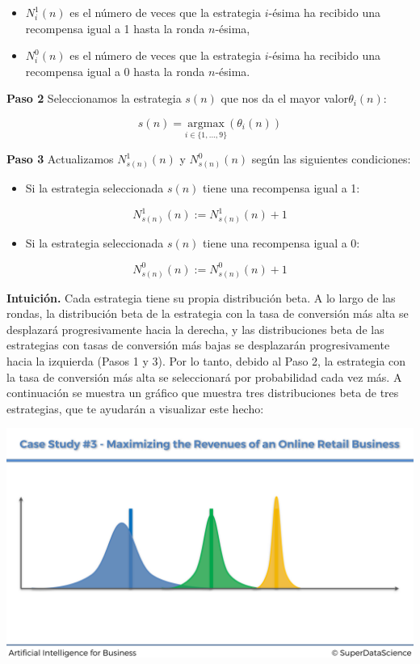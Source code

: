 \documentclass[
]{book}
\providecommand{\tightlist}{%
  \setlength{\itemsep}{0pt}\setlength{\parskip}{0pt}}
\begin{document}
\begin{itemize}
\tightlist
\item
  \(N_i^1(n)\) es el número de veces que la estrategia \(i\)-ésima ha recibido una recompensa igual a 1 hasta la ronda \(n\)-ésima,
\item
  \(N_i^0(n)\) es el número de veces que la estrategia \(i\)-ésima ha recibido una recompensa igual a 0 hasta la ronda \(n\)-ésima.
\end{itemize}

\textbf{Paso 2} Seleccionamos la estrategia \(s(n)\) que nos da el mayor valor\(\theta_i(n)\):

\[s(n) = \underset{i\in\{1,...,9\}}{\textrm{argmax}}(\theta_i(n))\]

\textbf{Paso 3} Actualizamos \(N_{s(n)}^1(n)\) y \(N_{s(n)}^0(n)\) según las siguientes condiciones:

\begin{itemize}
\tightlist
\item
  Si la estrategia seleccionada \(s(n)\) tiene una recompensa igual a 1:
\end{itemize}

\[N_{s(n)}^1(n) := N_{s(n)}^1(n) + 1\]

\begin{itemize}
\tightlist
\item
  Si la estrategia seleccionada \(s(n)\) tiene una recompensa igual a 0:
\end{itemize}

\[N_{s(n)}^0(n) := N_{s(n)}^0(n) + 1\]

\textbf{Intuición.} Cada estrategia tiene su propia distribución beta. A lo largo de las rondas, la distribución beta de la estrategia con la tasa de conversión más alta se desplazará progresivamente hacia la derecha, y las distribuciones beta de las estrategias con tasas de conversión más bajas se desplazarán progresivamente hacia la izquierda (Pasos 1 y 3). Por lo tanto, debido al Paso 2, la estrategia con la tasa de conversión más alta se seleccionará por probabilidad cada vez más. A continuación se muestra un gráfico que muestra tres distribuciones beta de tres estrategias, que te ayudarán a visualizar este hecho:

\includegraphics{Images/Beta_Distribution_Slide.png}
\end{document}
